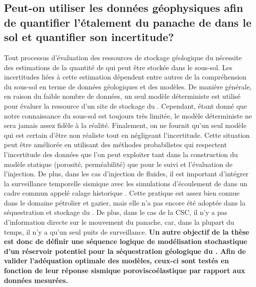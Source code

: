 \subsection{Peut-on utiliser les données géophysiques afin de quantifier
l'étalement du panache de \texorpdfstring{}{CO2} dans le sol et
quantifier son incertitude?}
\label{sc:obj2}
Tout processus d'évaluation des ressources de stockage géologique du 
nécessite des estimations de la quantité de  qui peut être stockée dans
le sous-sol. Les incertitudes liées à cette estimation dépendent entre autres de
la compréhension du sous-sol en terme de données géologiques et des modèles. De
manière générale, en raison du faible nombre de données, un seul modèle
déterministe est utilisé pour évaluer la ressource d'un site de stockage du
. Cependant, étant donné que notre connaissance du sous-sol est toujours
très limitée, le modèle déterministe ne sera jamais assez fidèle à la réalité.
Finalement, on ne fournit qu'un seul modèle qui est certain d'être non réaliste
tout en négligeant l'incertitude. Cette situation peut être améliorée en
utilisant des méthodes probabilistes qui respectent l'incertitude des données
que l'on peut exploiter tant dans la construction du modèle statique (porosité,
perméabilité) que pour le suivi et l'évaluation de l'injection. De plus, dans
les cas d'injection de fluides, il est important d’intégrer la surveillance
temporelle sismique avec les simulations d’écoulement de  dans un cadre
commun appelé calage historique \citep{Doyen2007}. Cette pratique est
assez bien connue dans le domaine pétrolier et gazier, mais elle n'a pas encore
été adoptée dans la séquestration et stockage du . De plus, dans le cas
de la CSC, il n'y a pas d'information directe sur le mouvement du panache, car,
dans la plupart du temps, il n'y a qu'un seul puits de surveillance.
\textbf{Un autre objectif de
la thèse est donc de définir une séquence logique de modélisation stochastique
d'un réservoir potentiel pour la séquestration géologique du . Afin de
valider l'adéquation optimale des modèles, ceux-ci sont testés en fonction de leur
réponse sismique poroviscoélastique par rapport aux données mesurées.}
